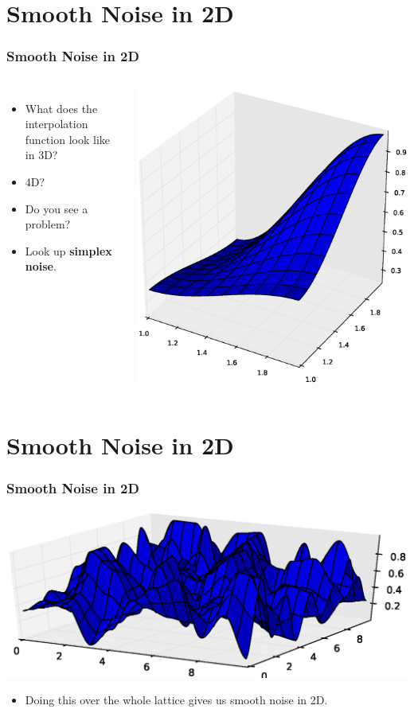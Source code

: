\documentclass[slidestop,xcolor=pst,dvips]{beamer}
\newcommand{\sect}[1]{
\section{#1}
\begin{frame}[fragile]\frametitle{#1}
}
\begin{document}
\sect{Smooth Noise in 2D}
\begin{columns}[T]
\begin{itemize}
\item What does the interpolation function look like in 3D?
\item  4D?
\item Do you see a problem?
\item Look up {\bf simplex noise}.
\end{itemize}
\includegraphics[width=\textwidth]{onesquaresurface.eps}
\end{columns}
\end{frame}




\sect{Smooth Noise in 2D}
\includegraphics[width=\textwidth]{smoothnoisesurface.eps}
\begin{itemize}
\item Doing this over the whole lattice gives us smooth noise in 2D.
\end{itemize}
\end{frame}
\end{document}
